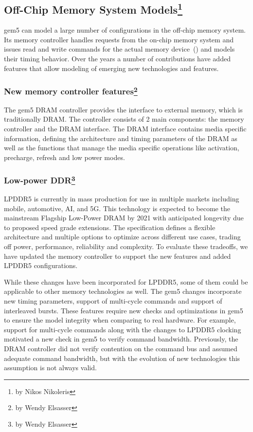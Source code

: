 \subsection[Off-Chip Memory System Models]{Off-Chip Memory System Models\footnote{by Nikos Nikoleris}}

gem5 can model a large number of configurations in the off-chip memory system.
Its memory controller handles requests from the on-chip memory system and issues read and write commands for the actual memory device~\cite{}() and models their timing behavior.
Over the years a number of contributions have added features that allow modeling of emerging new technologies and features.

\subsubsection[New memory controller features]{New memory controller features\footnote{by Wendy Elsasser}}

The gem5 DRAM controller provides the interface to external memory, which is traditionally DRAM.
The controller consists of 2 main components: the memory controller and the DRAM interface.
The DRAM interface contains media specific information, defining the architecture and timing parameters of the DRAM as well as the functions that manage the media specific operations like activation, precharge, refresh and low power modes.

\subsubsection[Low-power DDR]{Low-power DDR\footnote{by Wendy Elsasser}}

LPDDR5 is currently in mass production for use in multiple markets including mobile, automotive, AI, and 5G.
This technology is expected to become the mainstream Flagship Low-Power DRAM by 2021 with anticipated longevity due to proposed speed grade extensions.
The specification defines a flexible architecture and multiple options to optimize across different use cases, trading off power, performance, reliability and complexity.
To evaluate these tradeoffs, we have updated the memory controller to support the new features and added LPDDR5 configurations.

While these changes have been incorporated for LPDDR5, some of them could be applicable to other memory technologies as well.
The gem5 changes incorporate new timing parameters, support of multi-cycle commands and support of interleaved bursts.
These features require new checks and optimizations in gem5 to ensure the model integrity when comparing to real hardware.
For example, support for multi-cycle commands along with the changes to LPDDR5 clocking motivated a new check in gem5 to verify command bandwidth.
Previously, the DRAM controller did not verify contention on the command bus and assumed adequate command bandwidth, but with the evolution of new technologies this assumption is not always valid.

